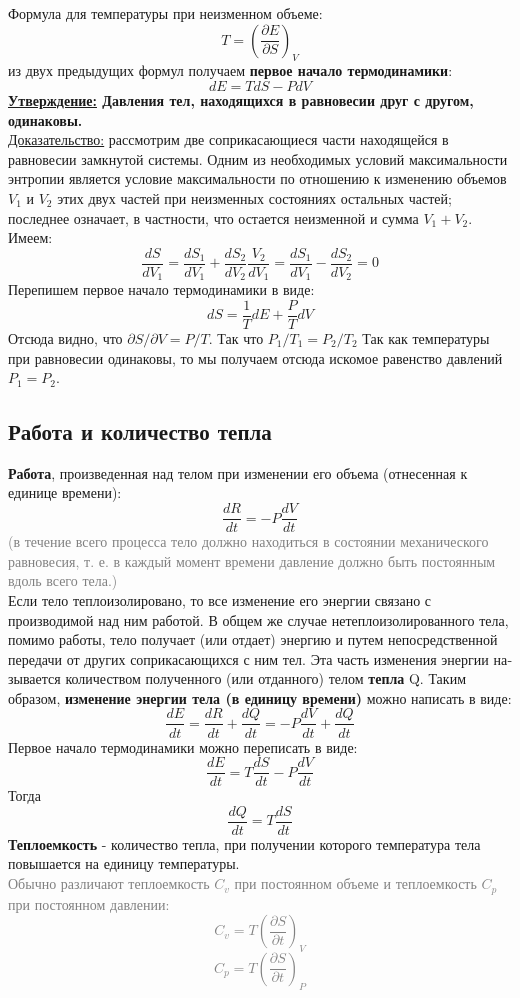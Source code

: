 Формула для температуры при неизменном объеме:
\begin{equation}\label{e1}
T = (\frac{\partial E}{\partial S})_V
\end{equation}
из двух предыдущих формул получаем \textbf{первое начало термодинамики}:
$$
dE = TdS - PdV
$$
\textbf{\underline{Утверждение:} Давления тел, находящихся в равновесии друг с другом, одинаковы.}\\
\underline{Доказательство:} рассмотрим две сопри­касающиеся части находящейся в равновесии замкнутой систе­мы. Одним из необходимых условий максимальности энтропии является условие максимальности по отношению к изменению объемов $V_1$ и $V_2$ этих двух частей при неизменных состояниях остальных частей; последнее означает, в частности, что остается неизменной и сумма $V_1 + V_2$. Имеем:
$$
\frac{dS}{dV_1} = \frac{dS_1}{dV_1} + \frac{dS_2}{dV_2}\frac{V_2}{dV_1} = \frac{dS_1}{dV_1} - \frac{dS_2}{dV_2} = 0
$$
Перепишем первое начало термодинамики в виде:
$$
dS = \frac{1}{T}dE+ \frac{P}{T}dV
$$
Отсюда видно, что $\partial S / \partial V = P / T$. Так что $P_1/T_1 = P_2/T_2$ Так как температуры при равновесии одинаковы, то мы получаем
отсюда искомое равенство давлений $P_1 = P_2$.

\subsection{Работа и количество тепла}
\textbf{Работа}, произведенная над телом
при изменении его объема (отнесенная к единице времени):
$$
\frac{dR}{dt} = -P\frac{dV}{dt}
$$
\textcolor{gray}{
(в течение всего процесса тело должно находиться в состоянии механическо­го равновесия, т. е. в каждый момент времени давление должно
быть постоянным вдоль всего тела.)}\\
Если тело теплоизолировано, то все изменение его энергии
связано с производимой над ним работой. В общем же случае
нетеплоизолированного тела, помимо работы, тело получает (или
отдает) энергию и путем непосредственной передачи от других
соприкасающихся с ним тел. Эта часть изменения энергии на­зывается количеством полученного (или отданного) телом \textbf{теп­ла} Q. Таким образом, \textbf{изменение энергии тела (в единицу време­ни)} можно написать в виде:
$$
\frac{dE}{dt} = \frac{dR}{dt} + \frac{dQ}{dt} = -P\frac{dV}{dt} + \frac{dQ}{dt}
$$
Первое начало термодинамики можно переписать в виде:
$$
\frac{dE}{dt} = T\frac{dS}{dt}-P\frac{dV}{dt}
$$
Тогда
$$
\frac{dQ}{dt} = T\frac{dS}{dt}
$$
\textbf{Теплоемкость} - количество тепла, при получении которого температура те­ла повышается на единицу температуры.\\
\textcolor{gray}{
Обычно различают теплоемкость $C_v$ при постоянном объеме и теплоемкость $C_p$ при постоянном давлении:
$$
C_v = T (\frac{\partial S}{\partial t})_V
$$
$$
C_p = T (\frac{\partial S}{\partial t})_P
$$
}


